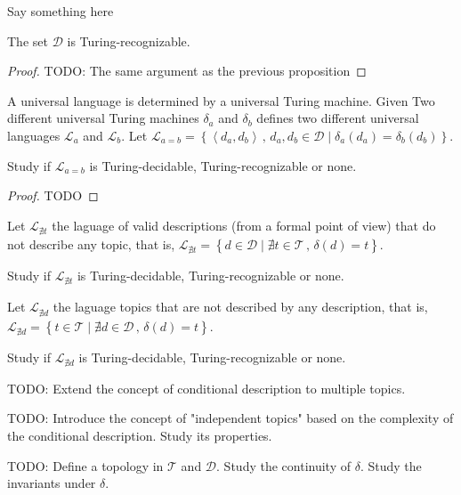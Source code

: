 Say something here

\begin{proposition}
The set $\mathcal{D}$ is Turing-recognizable.
\end{proposition}
\begin{proof}
{\color{red} TODO: The same argument as the previous proposition}
\end{proof}

A universal language is determined by a universal Turing machine. Given Two different universal Turing machines $\delta_{a}$ and $\delta_{b}$ defines two different universal languages $\mathcal{L}_{a}$ and $\mathcal{L}_{b}$. Let $\mathcal{L}_{a=b}=\left\{ \left\langle d_{a},d_{b}\right\rangle \,,\,d_{a},d_{b}\in\mathcal{D}\mid\delta_{a}\left(d_{a}\right)=\delta_{b}\left(d_{b}\right)\right\}$.

\begin{proposition}
Study if $\mathcal{L}_{a=b}$ is Turing-decidable, Turing-recognizable or none.
\end{proposition}
\begin{proof}
{\color{red} TODO}
\end{proof}

Let $\mathcal{L}_{\nexists t}$ the laguage of valid descriptions (from a formal point of view) that do not describe any topic, that is, $\mathcal{L}_{\nexists t}=\left\{ d\in\mathcal{D}\mid\nexists t\in\mathcal{T}\,,\,\delta\left(d\right)=t\right\}$.

\begin{proposition}
Study if $\mathcal{L}_{\nexists t}$ is Turing-decidable, Turing-recognizable or none.
\end{proposition}

Let $\mathcal{L}_{\nexists d}$ the laguage topics that are not described by any description, that is, $\mathcal{L}_{\nexists d}=\left\{ t\in\mathcal{T}\mid\nexists d\in\mathcal{D}\,,\,\delta\left(d\right)=t\right\}$.

\begin{proposition}
Study if $\mathcal{L}_{\nexists d}$ is Turing-decidable, Turing-recognizable or none.
\end{proposition}

{\color{red} TODO: Extend the concept of conditional description to multiple topics.}

{\color{red} TODO: Introduce the concept of "independent topics" based on the complexity of the conditional description. Study its properties.}

{\color{red} TODO: Define a topology in $\mathcal{T}$ and $\mathcal{D}$. Study the continuity of $\delta$. Study the invariants under $\delta$.}


